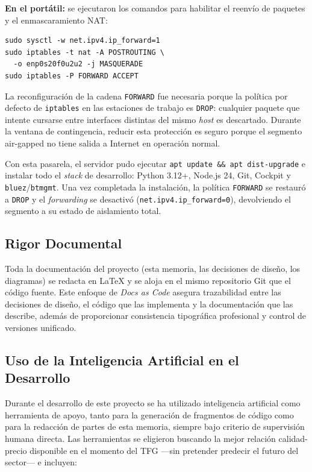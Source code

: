 \textbf{En el portátil:} se ejecutaron los comandos para habilitar el reenvío de paquetes y el enmascaramiento NAT:

\begin{verbatim}
sudo sysctl -w net.ipv4.ip_forward=1
sudo iptables -t nat -A POSTROUTING \
  -o enp0s20f0u2u2 -j MASQUERADE
sudo iptables -P FORWARD ACCEPT
\end{verbatim}

La reconfiguración de la cadena \texttt{FORWARD} fue necesaria porque la política por defecto de \texttt{iptables} en las estaciones de trabajo es \texttt{DROP}: cualquier paquete que intente cursarse entre interfaces distintas del mismo \textit{host} es descartado. Durante la ventana de contingencia, reducir esta protección es seguro porque el segmento air-gapped no tiene salida a Internet en operación normal.

Con esta pasarela, el servidor pudo ejecutar \texttt{apt update \&\& apt dist-upgrade} e instalar todo el \textit{stack} de desarrollo: Python 3.12+, Node.js 24, Git, Cockpit y \texttt{bluez}/\texttt{btmgmt}. Una vez completada la instalación, la política \texttt{FORWARD} se restauró a \texttt{DROP} y el \textit{forwarding} se desactivó (\texttt{net.ipv4.ip\_forward=0}), devolviendo el segmento a su estado de aislamiento total.

\subsection{Rigor Documental}

Toda la documentación del proyecto (esta memoria, las decisiones de diseño, los diagramas) se redacta en \LaTeX{} y se aloja en el mismo repositorio Git que el código fuente. Este enfoque de \textit{Docs as Code} asegura trazabilidad entre las decisiones de diseño, el código que las implementa y la documentación que las describe, además de proporcionar consistencia tipográfica profesional y control de versiones unificado.

\subsection{Uso de la Inteligencia Artificial en el Desarrollo}

Durante el desarrollo de este proyecto se ha utilizado inteligencia artificial como herramienta de apoyo, tanto para la generación de fragmentos de código como para la redacción de partes de esta memoria, siempre bajo criterio de supervisión humana directa. Las herramientas se eligieron buscando la mejor relación calidad-precio disponible en el momento del TFG ---sin pretender predecir el futuro del sector--- e incluyen:

